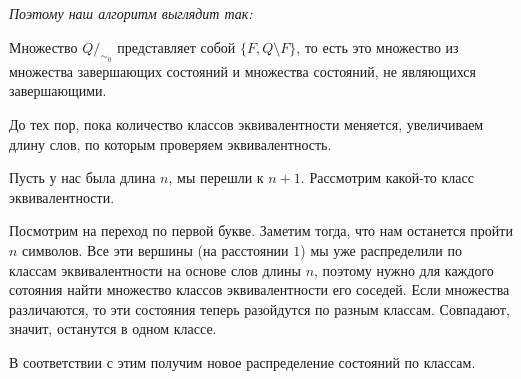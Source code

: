 \EndProof

\textit{Поэтому наш алгоритм выглядит так:}

Множество $Q /_{\sim_0}$ представляет собой $\{ F, Q \setminus F \}$, то есть это множество из множества завершающих состояний и множества состояний, не являющихся завершающими.

До тех пор, пока количество классов эквивалентности меняется, увеличиваем длину слов, по которым проверяем эквивалентность.

Пусть у нас была длина $n$, мы перешли к $n + 1$. Рассмотрим какой-то класс эквивалентности. 

Посмотрим на переход по первой букве. Заметим тогда, что нам останется пройти $n$ символов. Все эти вершины (на расстоянии $1$) мы уже распределили по классам эквивалентности на основе слов длины $n$, поэтому нужно для каждого сотояния найти множество классов эквивалентности его соседей. Если множества различаются, то эти состояния теперь разойдутся по разным классам. Совпадают, значит, останутся в одном классе. 

В соответствии с этим получим новое распределение состояний по классам.

